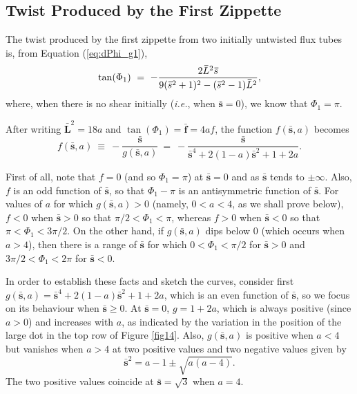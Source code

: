 \documentclass[10pt,namedreferneces]{SolarPhysics}
\begin{document}
\begin{article}
\appendix
\section{Twist Produced by the First Zippette}

The twist produced by the first zippette from two initially untwisted flux tubes is, from Equation (\ref{eq:dPhi_g1}),
\begin{equation}
  \tan(\Phi_1) ~=~ -{2\bm\bar{L}^2\bm\bar{s}\over 9(\bm\bar{s}^2+1)^2 - (\bm\bar{s}^2-1)\bm\bar{L}^2},
  	\label{app1}
\end{equation}
where, when there is no shear initially ({\textit {i.e.}}, when ${\bm\bar s}=0$), we know that $\Phi_1=\pi$.

After writing $\bm\bar{L}^2=18a$ and $\tan(\Phi_1)=\bm\bar{f}=4a f$, the function $f({\bm\bar s},a)$ becomes
\begin{equation}
  f ({\bm\bar s},a)~\equiv~-\frac{{\bm\bar s}}{g({\bm\bar s},a)}~=~ -\frac{{\bm\bar s}}{{\bm\bar s}^4 +2(1-a){\bm\bar s}^2+1+2a}.
  	\label{app2}
\end{equation}

First of all, note that $f=0$ (and so $\Phi_1=\pi$) at ${\bm\bar s}=0$ and  as ${\bm\bar s}$ tends to $\pm \infty$. Also,  $f$ is an odd function of ${\bm\bar s}$, so that $\Phi_1-\pi$ is an antisymmetric function of ${\bm\bar s}$.
For values of $a$ for which $g({\bm\bar s},a)>0$ (namely, $0<a<4$, as we shall prove below),  $f<0$ when ${\bm\bar s}>0$ so that $\pi/2<\Phi_1<\pi$, whereas $f>0$ when ${\bm\bar s}<0$ so that $\pi<\Phi_1<3\pi/2$. On the other hand, if $g({\bm\bar s},a)$ dips below $0$ (which occurs when $a>4$), then there is a range of ${\bm\bar s}$ for which $0<\Phi_1<\pi/2$ for ${\bm\bar s}>0$ and $3\pi/2<\Phi_1<2\pi$ for ${\bm\bar s}<0$.

In order to establish these facts and sketch the curves, consider first $g({\bm\bar s},a)={\bm\bar s}^4 +2(1-a){\bm\bar s}^2+1+2a$, which is an even function of ${\bm\bar s}$, so we focus on its behaviour when ${\bm\bar s}\geq0$. At ${\bm\bar s}=0$, $g=1+2a$, which is always positive (since $a>0$) and increases with $a$, as indicated by the variation in the position of the large dot in the top row of Figure \ref{fig14}. Also, $g({\bm\bar s},a)$  is positive when $a<4$ but vanishes when $a>4$ at two positive values and two negative values given by
\begin{equation}
{\bm\bar s}^2=a-1\pm\sqrt{a(a-4)}.
\label{app3}
\end{equation}
The two positive values coincide at ${\bm\bar s}=\sqrt3$ when $a=4$.


\end{article}
\end{document}

